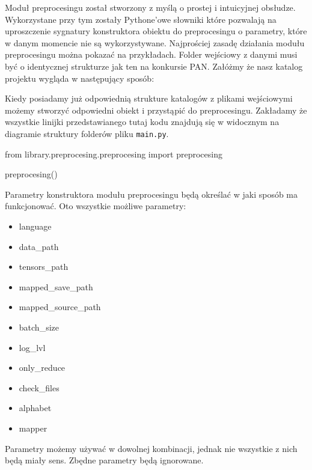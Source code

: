 Moduł preprocesingu został stworzony z myślą o prostej i intuicyjnej obsłudze. Wykorzystane przy
tym zostały Pythone'owe słowniki które pozwalają na uproszczenie sygnatury konstruktora obiektu do preprocesingu
o parametry, które w danym momencie nie są wykorzystywane. Najprościej zasadę działania modułu preprocesingu można 
pokazać na przykładach. Folder wejściowy z danymi musi być o identycznej strukturze jak ten na 
konkursie PAN.
Załóżmy że nasz katalog projektu wygląda w następujący sposób:


\myspace
{}
\myspace

Kiedy posiadamy już odpowiednią strukture katalogów z plikami wejściowymi możemy stworzyć 
odpowiedni obiekt i przystąpić do preprocesingu. Zakładamy że wszystkie linijki przedstawianego 
tutaj kodu znajdują się w widocznym na diagramie struktury folderów pliku \texttt{main.py}.

\begin{python}
from library.preprocesing.preprocesing import preprocesing

preprocesing()

\end{python}

Parametry konstruktora modułu preprocesingu będą określać w jaki sposób ma funkcjonować. 
Oto wszystkie możliwe parametry:
\begin{itemize}
	\item language
	\item data\_path
	\item tensors\_path
	\item mapped\_save\_path
	\item mapped\_source\_path
	\item batch\_size
	\item log\_lvl
	\item only\_reduce
	\item check\_files
	\item alphabet
	\item mapper
\end{itemize}

Parametry możemy używać w dowolnej kombinacji, jednak nie wszystkie z nich będą miały sens. Zbędne
parametry będą ignorowane.


